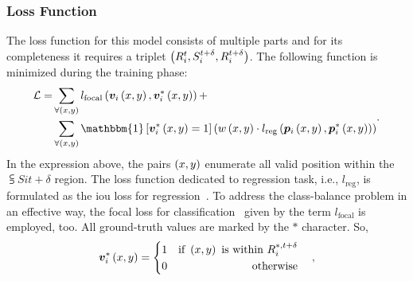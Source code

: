 \subsubsection{Loss Function}

The loss function for this model consists of multiple parts and for its completeness it requires a triplet $\left( {{R}_{i}^{t}, {S}_{i}^{t + \delta}, {R}_{i}^{t + \delta}} \right)$. The following function is minimized during the training phase:
\begin{equation}
    \begin{aligned}
        \lossf =
         & \sum_{\forall \rbrackets{x, y}}
        \func{l_{\text{focal}}}{
            \func{\mtxsub{v}{i}}{
                x, y
            },
            \func{\mtxsubsup{v}{i}{*}}{
                x, y
            }
        } +                                \\
         & \sum_{\forall \rbrackets{x, y}}
        \mathbbm{1}
        \sbrackets{
            \func{\mtxsubsup{v}{i}{*}}{
                x, y
            } = 1
        }
        \rbrackets{
            \func{w}{x, y}
            \cdot
            \func{l_{\text{reg}}}{
                \func{\mtxsub{p}{i}}{x, y},
                \func{\mtxsubsup{p}{i}{*}}{x, y}
            }
        }
    \end{aligned}.
\end{equation}
In the expression above, the pairs $\left( {x, y} \right)$ enumerate all valid position within the $\subsup{S}{i}{t + \delta}$ region. The loss function dedicated to regression task, i.e., $l_{\text{reg}}$, is formulated as the \gls{iou} loss for regression~\cite{danelljan2019atom, yu2016unitbox}. To address the class-balance problem in an effective way, the focal loss for classification~\cite{lin2018focal} given by the term $l_{\text{focal}}$ is employed, too. All ground-truth values are marked by the $*$ character. So,
\begin{equation}
    {\bm{v}_{i}^{*}} \left( x, y \right) =
    \begin{cases}
        \begin{aligned}
             & 1 & \text{if } \left( {x, y} \right) \text{ is within } {R}_{i}^{*, t + \delta} \\
             & 0 & \text{otherwise}                                                            \\
        \end{aligned}
    \end{cases},
\end{equation}
